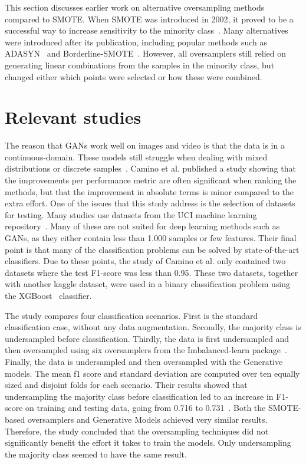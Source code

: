 This section discusses earlier work on alternative oversampling methods compared to SMOTE. When SMOTE was introduced in 2002, it proved to be a successful way to increase sensitivity to the minority class~\cite{Chawla2002SMOTE:Technique}. Many alternatives were introduced after its publication, including popular methods such as ADASYN~\cite{He2008ADASYN:Learning} and Borderline-SMOTE~\cite{Han2005Borderline-SMOTE:Learning}. However, all oversamplers still relied on generating linear combinations from the samples in the minority class, but changed either which points were selected or how these were combined. 

\section{Relevant studies}
The reason that GANs work well on images and video is that the data is in a continuous-domain. These models still struggle when dealing with mixed distributions or discrete samples~\cite{Camino2020OversamplingEffort}. Camino et al. published a study showing that the improvements per performance metric are often significant when ranking the methods, but that the improvement in absolute terms is minor compared to the extra effort. One of the issues that this study address is the selection of datasets for testing. Many studies use datasets from the UCI machine learning repository~\cite{Dua2017UCIRepository}. Many of these are not suited for deep learning methods such as GANs, as they either contain less than 1.000 samples or few features. Their final point is that many of the classification problems can be solved by state-of-the-art classifiers. Due to these points, the study of Camino et al. only contained two datasets where the test F1-score was less than 0.95. These two datasets, together with another kaggle dataset, were used in a binary classification problem using the XGBoost~\cite{Chen2016XGBoost:System} classifier. 

The study compares four classification scenarios. First is the standard classification case, without any data augmentation. Secondly, the majority class is undersampled before classification. Thirdly, the data is first undersampled and then oversampled using six oversamplers from the Imbalanced-learn package~\cite{Lemaitre2017Imbalanced-learn:Learning}. Finally, the data is undersampled and then oversampled with the Generative models. The mean f1 score and standard deviation are computed over ten equally sized and disjoint folds for each scenario. Their results showed that undersampling the majority class before classification led to an increase in F1-score on training and testing data, going from 0.716 to 0.731~\cite{Camino2020OversamplingEffort}. Both the SMOTE-based oversamplers and Generative Models achieved very similar results. Therefore, the study concluded that the oversampling techniques did not significantly benefit the effort it takes to train the models. Only undersampling the majority class seemed to have the same result.

